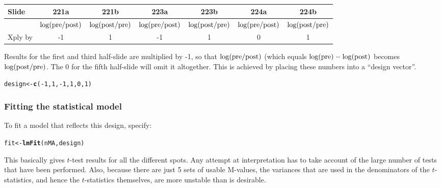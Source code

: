 \documentclass[a4paper,9pt]{article}\usepackage[]{graphicx}\usepackage[]{color}
\makeatletter
\newcommand{\hlnum}[1]{\textcolor[rgb]{0.686,0.059,0.569}{#1}}%
\newcommand{\hlopt}[1]{\textcolor[rgb]{0,0,0}{#1}}%
\newcommand{\hlstd}[1]{\textcolor[rgb]{0.345,0.345,0.345}{#1}}%
\newcommand{\hlkwb}[1]{\textcolor[rgb]{0.69,0.353,0.396}{#1}}%
\newcommand{\hlkwd}[1]{\textcolor[rgb]{0.737,0.353,0.396}{\textbf{#1}}}%
\newenvironment{kframe}{%
 \def\at@end@of@kframe{}%
 \ifinner\ifhmode%
  \def\at@end@of@kframe{\end{minipage}}%
  \begin{minipage}{\columnwidth}%
 \fi\fi%
 \def\FrameCommand##1{\hskip\@totalleftmargin \hskip-\fboxsep
 \colorbox{shadecolor}{##1}\hskip-\fboxsep
     \hskip-\linewidth \hskip-\@totalleftmargin \hskip\columnwidth}%
 \MakeFramed {\advance\hsize-\width
   \@totalleftmargin\z@ \linewidth\hsize
   \@setminipage}}%
 {\par\unskip\endMakeFramed%
 \at@end@of@kframe}
\newenvironment{knitrout}{}{} %
\makeatother
\begin{document}
\begin{tabular}{lcccccc}
Slide & 221a & 221b & 223a & 223b & 224a & 224b \\
\hline
 & $\log({\rm pre/post)}$ & $\log({\rm post/pre)}$
 & $\log({\rm pre/post)}$ & $\log({\rm post/pre)}$
 & $\log({\rm pre/post)}$ & $\log({\rm post/pre)}$ \\
Xply by & -1 & 1 &  -1 & 1 &  0 & 1 \\
\hline
\end{tabular}
\vspace*{3pt}

Results for the first and third half-slide are multiplied by -1,
so that $\log({\rm pre/post)}$ (which equals
$\log({\rm pre}) - \log({\rm post)}$ becomes $\log({\rm post/pre)}$.
The 0 for the fifth half-slide will omit it altogether.
This is achieved by placing these numbers into a ``design vector''.
\begin{knitrout}
\color{fgcolor}\begin{kframe}
\begin{alltt}
\hlstd{design} \hlkwb{<-} \hlkwd{c}\hlstd{(}\hlopt{-}\hlnum{1}\hlstd{,} \hlnum{1}\hlstd{,} \hlopt{-}\hlnum{1}\hlstd{,} \hlnum{1}\hlstd{,} \hlnum{0}\hlstd{,} \hlnum{1}\hlstd{)}
\end{alltt}
\end{kframe}
\end{knitrout}

\subsubsection*{Fitting the statistical model}
To fit a model that reflects this design, specify:
\begin{knitrout}
\color{fgcolor}\begin{kframe}
\begin{alltt}
\hlstd{fit} \hlkwb{<-} \hlkwd{lmFit}\hlstd{(nMA, design)}
\end{alltt}
\end{kframe}
\end{knitrout}
This basically gives $t$-test results for all the different spots.
Any attempt at interpretation has to take account of the large number
of tests that have been performed.  Also, because there are just 5
sets of usable M-values, the variances that are used in the
denominators of the $t$-statistics, and hence the $t$-statistics
themselves, are more unstable than is desirable.
\end{document}
